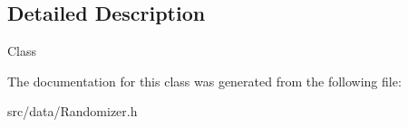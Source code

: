 \subsection{Detailed Description}
Class 

The documentation for this class was generated from the following file\-:\begin{DoxyCompactItemize}
\item 
src/data/Randomizer.\-h\end{DoxyCompactItemize}
